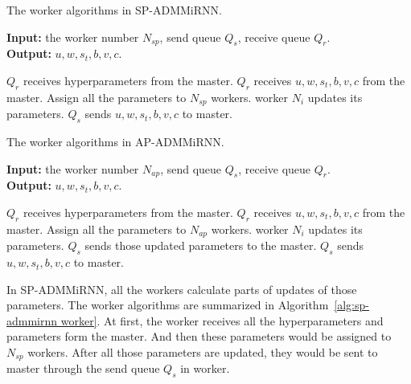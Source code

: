 \documentclass[twoside]{article}
\begin{document}
\begin{multicols}{2}
\begin{algorithm}[H]
\caption{The worker algorithms in SP-ADMMiRNN.} \label{alg:sp-admmirnn worker}
\hspace*{0.02in} 
\textbf{Input:} the worker number $N_{sp}$, send queue $Q_s$, receive queue $Q_r$. \\
\hspace*{0.02in}  
\textbf{Output:} $u, w, s_{t}, b, v, c$.  \\
\begin{algorithmic}[1]
\STATE $Q_r$ receives hyperparameters from the master.  
\STATE $Q_r$ receives $u, w, s_{t}, b, v, c$ from the master.
\STATE Assign all the parameters to $N_{sp}$ workers. 
        \STATE worker $N_i$ updates its parameters.
    \ENDFOR
	\STATE $Q_s$ sends $u, w, s_{t}, b, v, c$ to master.
\ENDFOR
\end{algorithmic}
\end{algorithm}

\begin{algorithm}[H]
\caption{The worker algorithms in AP-ADMMiRNN.} \label{alg:ap-admmirnn worker}
\hspace*{0.02in} 
\textbf{Input:} the worker number $N_{ap}$, send queue $Q_s$, receive queue $Q_r$. \\
\hspace*{0.02in}  
\textbf{Output:} $u, w, s_{t}, b, v, c$.\\
\begin{algorithmic}[1]
\STATE $Q_r$ receives hyperparameters from the master.  
\STATE $Q_r$ receives $u, w, s_{t}, b, v, c$ from the master.
\STATE Assign all the parameters to $N_{ap}$ workers. 
        \STATE worker $N_i$ updates its parameters.
        \STATE $Q_s$ sends those updated parameters to the master.
    \ENDFOR
	\STATE $Q_s$ sends $u, w, s_{t}, b, v, c$ to master.
\ENDFOR
\end{algorithmic}
\end{algorithm}

In SP-ADMMiRNN, all the workers calculate parts of updates of those parameters. The worker algorithms are summarized in Algorithm~\ref{alg:sp-admmirnn worker}. At first, the worker receives all the hyperparameters and parameters form the master. And then these parameters would be assigned to $N_{sp}$ workers. After all those parameters are updated, they would be sent to master through the send queue $Q_s$ in worker.
 

\end{multicols}
\end{document}
